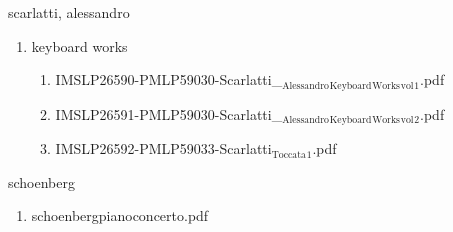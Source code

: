 \documentclass[11pt]{article}
\begin{document}
\item scarlatti, alessandro
\label{sec-1-1-1-1-44-57}
\begin{enumerate}
\item keyboard works
\label{sec-1-1-1-1-44-57-1}
\begin{enumerate}
\item IMSLP26590-PMLP59030-Scarlatti\_$_{\text{Alessandro}}$$_{\text{Keyboard}}$$_{\text{Works}}$$_{\text{vol}}$$_{\text{1}}$.pdf
\label{sec-1-1-1-1-44-57-1-1}

\item IMSLP26591-PMLP59030-Scarlatti\_$_{\text{Alessandro}}$$_{\text{Keyboard}}$$_{\text{Works}}$$_{\text{vol}}$$_{\text{2}}$.pdf
\label{sec-1-1-1-1-44-57-1-2}

\item IMSLP26592-PMLP59033-Scarlatti$_{\text{Toccata}}$$_{\text{1}}$.pdf
\label{sec-1-1-1-1-44-57-1-3}
\end{enumerate}
\end{enumerate}

\item schoenberg
\label{sec-1-1-1-1-44-58}
\begin{enumerate}
\item schoenbergpianoconcerto.pdf
\label{sec-1-1-1-1-44-58-1}
\end{enumerate}
\end{document}
